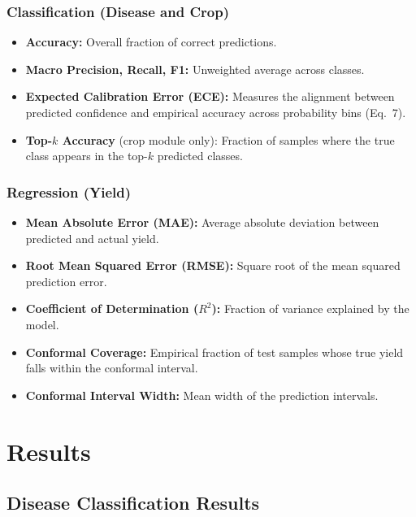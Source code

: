 \documentclass[conference]{IEEEtran}
\begin{document}
\subsubsection{Classification (Disease and Crop)}
\begin{itemize}[leftmargin=*]
  \item \textbf{Accuracy:} Overall fraction of correct predictions.
  \item \textbf{Macro Precision, Recall, F1:} Unweighted average across classes.
  \item \textbf{Expected Calibration Error (ECE):} Measures the alignment between predicted confidence and empirical accuracy across probability bins (Eq.~7).
  \item \textbf{Top-$k$ Accuracy} (crop module only): Fraction of samples where the true class appears in the top-$k$ predicted classes.
\end{itemize}

\subsubsection{Regression (Yield)}
\begin{itemize}[leftmargin=*]
  \item \textbf{Mean Absolute Error (MAE):} Average absolute deviation between predicted and actual yield.
  \item \textbf{Root Mean Squared Error (RMSE):} Square root of the mean squared prediction error.
  \item \textbf{Coefficient of Determination ($R^{2}$):} Fraction of variance explained by the model.
  \item \textbf{Conformal Coverage:} Empirical fraction of test samples whose true yield falls within the conformal interval.
  \item \textbf{Conformal Interval Width:} Mean width of the prediction intervals.
\end{itemize}


\section{Results}
\label{sec:results}

\subsection{Disease Classification Results}
\end{document}
